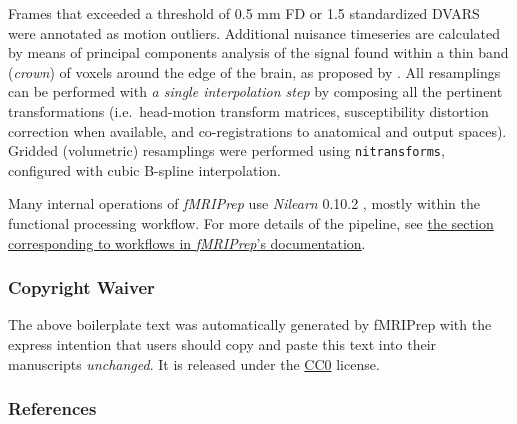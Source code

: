 \documentclass[
]{article}
\begin{document}
\begin{description}
Frames that exceeded a threshold of 0.5 mm FD or 1.5 standardized DVARS
were annotated as motion outliers. Additional nuisance timeseries are
calculated by means of principal components analysis of the signal found
within a thin band (\emph{crown}) of voxels around the edge of the
brain, as proposed by \citep{patriat_improved_2017}. All resamplings can
be performed with \emph{a single interpolation step} by composing all
the pertinent transformations (i.e.~head-motion transform matrices,
susceptibility distortion correction when available, and
co-registrations to anatomical and output spaces). Gridded (volumetric)
resamplings were performed using \texttt{nitransforms}, configured with
cubic B-spline interpolation.
\end{description}

Many internal operations of \emph{fMRIPrep} use \emph{Nilearn} 0.10.2
\citep[RRID:SCR\_001362]{nilearn}, mostly within the functional
processing workflow. For more details of the pipeline, see
\href{https://fmriprep.readthedocs.io/en/latest/workflows.html}{the
section corresponding to workflows in \emph{fMRIPrep}'s documentation}.

\hypertarget{copyright-waiver}{%
\subsubsection{Copyright Waiver}\label{copyright-waiver}}

The above boilerplate text was automatically generated by fMRIPrep with
the express intention that users should copy and paste this text into
their manuscripts \emph{unchanged}. It is released under the
\href{https://creativecommons.org/publicdomain/zero/1.0/}{CC0} license.

\hypertarget{references}{%
\subsubsection{References}\label{references}}

  
\end{document}
